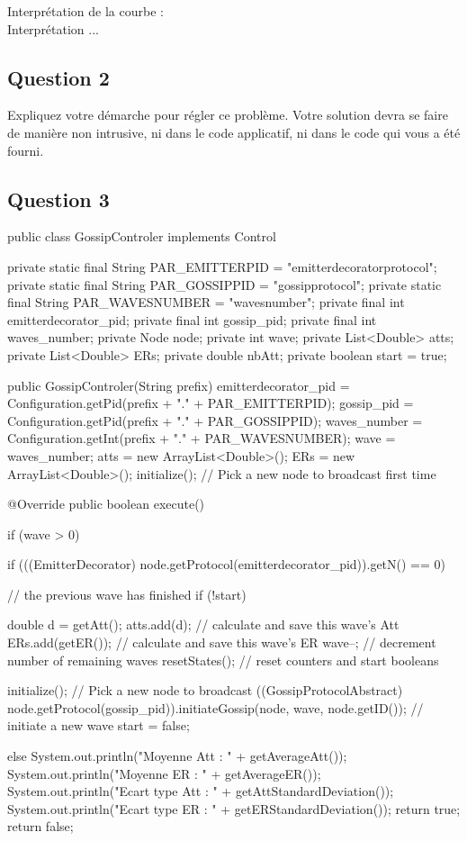 \documentclass[10pt]{report}
\begin{document}
Interprétation de la courbe :\\
Interprétation ...

\subsection{Question 2}

Expliquez votre démarche pour régler ce problème. Votre solution devra se faire de
manière non intrusive, ni dans le code applicatif, ni dans le code qui vous a été fourni.

\newpage
\subsection{Question 3}

\begin{boxedlisting}
public class GossipControler implements Control {
	private static final String PAR_EMITTERPID = "emitterdecoratorprotocol";
	private static final String PAR_GOSSIPPID = "gossipprotocol";
	private static final String PAR_WAVESNUMBER = "wavesnumber";
	private final int emitterdecorator_pid;
	private final int gossip_pid;
	private final int waves_number;
	private Node node;
	private int wave;
	private List<Double> atts;
	private List<Double> ERs;
	private double nbAtt;
	private boolean start = true;

	public GossipControler(String prefix) {
		emitterdecorator_pid = Configuration.getPid(prefix + "." + PAR_EMITTERPID);
		gossip_pid = Configuration.getPid(prefix + "." + PAR_GOSSIPPID);
		waves_number = Configuration.getInt(prefix + "." + PAR_WAVESNUMBER);
		wave = waves_number;
		atts = new ArrayList<Double>();
		ERs = new ArrayList<Double>();
		initialize(); // Pick a new node to broadcast first time
	}

	@Override
	public boolean execute() {
		if (wave > 0) {
			if (((EmitterDecorator) node.getProtocol(emitterdecorator_pid)).getN() == 0) { // the previous wave has finished
			if (!start) {
					double d = getAtt();
					atts.add(d); // calculate and save this wave's Att
					ERs.add(getER()); // calculate and save this wave's ER
					wave--; // decrement number of remaining waves
					resetStates(); // reset counters and start booleans
					
				}
				initialize(); // Pick a new node to broadcast
				((GossipProtocolAbstract) node.getProtocol(gossip_pid)).initiateGossip(node, wave, node.getID()); // initiate a new wave
				start = false;
			}
		} else {
			System.out.println("Moyenne Att : " + getAverageAtt());
			System.out.println("Moyenne ER : " + getAverageER());
			System.out.println("Ecart type Att : " + getAttStandardDeviation());
			System.out.println("Ecart type ER : " + getERStandardDeviation());
			return true;
		}
		return false;
	}
	
}
\end{boxedlisting}
\end{document}
